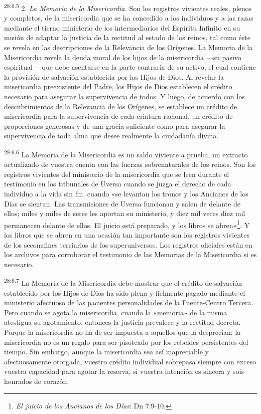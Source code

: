 \par
\textsuperscript{28:6.5} 2. \textit{La Memoria de la Misericordia.} Son los registros vivientes reales, plenos y completos, de la misericordia que se ha concedido a los individuos y a las razas mediante el tierno ministerio de los intermediarios del Espíritu Infinito en su misión de adaptar la justicia de la rectitud al estado de los reinos, tal como éste se revela en las descripciones de la Relevancia de los Orígenes. La Memoria de la Misericordia revela la deuda moral de los hijos de la misericordia ---su pasivo espiritual--- que debe asentarse en la parte contraria de su activo, el cual contiene la provisión de salvación establecida por los Hijos de Dios. Al revelar la misericordia preexistente del Padre, los Hijos de Dios establecen el crédito necesario para asegurar la supervivencia de todos. Y luego, de acuerdo con los descubrimientos de la Relevancia de los Orígenes, se establece un crédito de misericordia para la supervivencia de cada criatura racional, un crédito de proporciones generosas y de una gracia suficiente como para asegurar la supervivencia de toda alma que desee realmente la ciudadanía divina.

\par
\textsuperscript{28:6.6} La Memoria de la Misericordia es un saldo viviente a prueba, un extracto actualizado de vuestra cuenta con las fuerzas sobrenaturales de los reinos. Son los registros vivientes del ministerio de la misericordia que se leen durante el testimonio en los tribunales de Uversa cuando se juzga el derecho de cada individuo a la vida sin fin, cuando «se levantan los tronos y los Ancianos de los Días se sientan. Las transmisiones de Uversa funcionan y salen de delante de ellos; miles y miles de seres les aportan su ministerio, y diez mil veces diez mil permanecen delante de ellos. El juicio está preparado, y los libros se abren»\footnote{\textit{El juicio de los Ancianos de los Días}: Dn 7:9-10.}. Y los libros que se abren en una ocasión tan importante son los registros vivientes de los seconafines terciarios de los superuniversos. Los registros oficiales están en los archivos para corroborar el testimonio de las Memorias de la Misericordia si es necesario.

\par
\textsuperscript{28:6.7} La Memoria de la Misericordia debe mostrar que el crédito de salvación establecido por los Hijos de Dios ha sido plena y fielmente pagado mediante el ministerio afectuoso de las pacientes personalidades de la Fuente-Centro Tercera. Pero cuando se agota la misericordia, cuando la «memoria» de la misma atestigua su agotamiento, entonces la justicia prevalece y la rectitud decreta. Porque la misericordia no ha de ser impuesta a aquellos que la desprecian; la misericordia no es un regalo para ser pisoteado por los rebeldes persistentes del tiempo. Sin embargo, aunque la misericordia sea así inapreciable y afectuosamente otorgada, vuestro crédito individual sobrepasa siempre con exceso vuestra capacidad para agotar la reserva, si vuestra intención es sincera y sois honrados de corazón.

